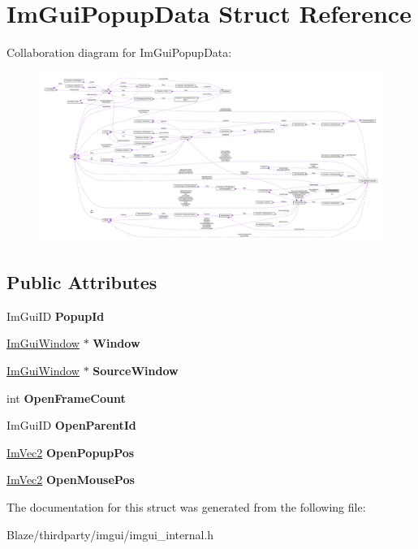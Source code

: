 \hypertarget{structImGuiPopupData}{}\section{Im\+Gui\+Popup\+Data Struct Reference}
\label{structImGuiPopupData}


Collaboration diagram for Im\+Gui\+Popup\+Data\+:\nopagebreak
\begin{figure}[H]
\begin{center}
\leavevmode
\includegraphics[width=350pt]{structImGuiPopupData__coll__graph}
\end{center}
\end{figure}
\subsection*{Public Attributes}
\begin{DoxyCompactItemize}
\item 
\mbox{\label{structImGuiPopupData_a3cd694871e2313afc9174de18fe76609}} 
Im\+Gui\+ID {\bfseries Popup\+Id}
\item 
\mbox{\label{structImGuiPopupData_ab614c60173f7af6d878122502bd8d87c}} 
\hyperlink{structImGuiWindow}{Im\+Gui\+Window} $\ast$ {\bfseries Window}
\item 
\mbox{\label{structImGuiPopupData_a1c7a8e7fbc62e9432b5b1b69bdd7ddcc}} 
\hyperlink{structImGuiWindow}{Im\+Gui\+Window} $\ast$ {\bfseries Source\+Window}
\item 
\mbox{\label{structImGuiPopupData_a31a882f4cd1e73543010c43d056e5edb}} 
int {\bfseries Open\+Frame\+Count}
\item 
\mbox{\label{structImGuiPopupData_ace5fe62768d9020db88cbba81ca12ad5}} 
Im\+Gui\+ID {\bfseries Open\+Parent\+Id}
\item 
\mbox{\label{structImGuiPopupData_a78925fbd1498d3b92037665535a7a8fc}} 
\hyperlink{structImVec2}{Im\+Vec2} {\bfseries Open\+Popup\+Pos}
\item 
\mbox{\label{structImGuiPopupData_a9d48ffe56872b2e87bc220d619594a55}} 
\hyperlink{structImVec2}{Im\+Vec2} {\bfseries Open\+Mouse\+Pos}
\end{DoxyCompactItemize}


The documentation for this struct was generated from the following file\+:\begin{DoxyCompactItemize}
\item 
Blaze/thirdparty/imgui/imgui\+\_\+internal.\+h\end{DoxyCompactItemize}

